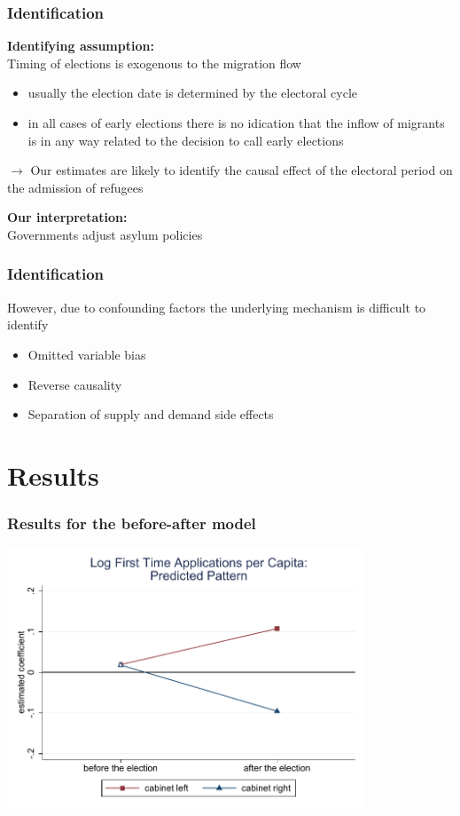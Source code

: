 \documentclass[compress, xcolor = {table,xcdraw}]{beamer}
\begin{document}
\begin{frame}
\frametitle{Identification}
\textbf{Identifying assumption:} \\
Timing of elections is exogenous to the migration flow 

\begin{itemize}
	\item usually the election date is determined by the electoral cycle
	\item in all cases of early elections there is no idication that the inflow of migrants is in any way related to the decision to call early elections 
\end{itemize}

$\rightarrow$ Our estimates are likely to identify the causal effect of the electoral
period on the admission of refugees 
\bigskip

\textbf{Our interpretation:} \\
Governments adjust asylum policies

\end{frame}



\begin{frame}
\frametitle{Identification}
However, due to confounding factors the underlying mechanism is difficult to identify
\smallskip
\begin{itemize}
	\item Omitted variable bias 
	\item Reverse causality
	\item Separation of supply and demand side effects
\end{itemize}
\end{frame}


\section{Results}
\begin{frame} [t]
\frametitle{Results for the before-after model}
\begin{center}	
	\includegraphics[width=0.8\textwidth] {../paper/inputs/app_graph1_baseline.pdf}	
\end{center}
\end{frame}
\end{document}
